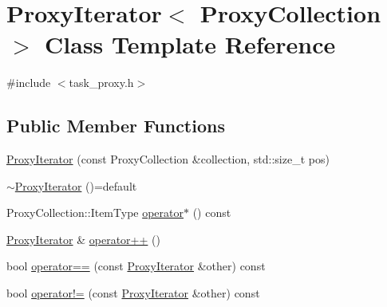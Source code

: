 \hypertarget{classProxyIterator}{\section{Proxy\-Iterator$<$ Proxy\-Collection $>$ Class Template Reference}
\label{classProxyIterator}
}


{\ttfamily \#include $<$task\-\_\-proxy.\-h$>$}

\subsection*{Public Member Functions}
\begin{DoxyCompactItemize}
\item 
\hyperlink{classProxyIterator_a962fbae6e2d03282f08f0c84b93fa52b}{Proxy\-Iterator} (const Proxy\-Collection \&collection, std\-::size\-\_\-t pos)
\item 
\hyperlink{classProxyIterator_a72a09f71aa31c4377eea9f57776337ac}{$\sim$\-Proxy\-Iterator} ()=default
\item 
Proxy\-Collection\-::\-Item\-Type \hyperlink{classProxyIterator_a4ac5b0e04c9207caffd8932bc4f20dca}{operator$\ast$} () const 
\item 
\hyperlink{classProxyIterator}{Proxy\-Iterator} \& \hyperlink{classProxyIterator_a53a50e66c49058c986a90c4c2aeffcb9}{operator++} ()
\item 
bool \hyperlink{classProxyIterator_a598e3a422d557d11d5702128151dff82}{operator==} (const \hyperlink{classProxyIterator}{Proxy\-Iterator} \&other) const 
\item 
bool \hyperlink{classProxyIterator_a7e5c3c76939b31026840cd0440a5b3cf}{operator!=} (const \hyperlink{classProxyIterator}{Proxy\-Iterator} \&other) const 
\end{DoxyCompactItemize}


